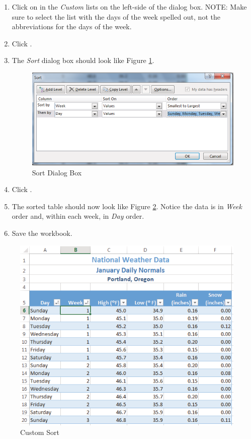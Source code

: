 \begin{enumbox}
\begin{enumerate}
		\item Click on  in the \textit{Custom} lists on the left-side of the dialog box. NOTE: Make sure to select the list with the days of the week spelled out, not the abbreviations for the days of the week.
		\item Click . 
		\item The \textit{Sort} dialog box should look like Figure \ref{05:fig14}.

		\begin{figure}[H]
			\centering
			\includegraphics[width=\maxwidth{.95\linewidth}]{gfx/ch05_fig14}
			\caption{Sort Dialog Box}
			\label{05:fig14}
		\end{figure}

		\item Click .
		\item The sorted table should now look like Figure \ref{05:fig15}. Notice the data is in \textit{Week} order and, within each week, in \textit{Day} order.
		\item Save the  workbook.
	\end{enumerate}
\end{enumbox}
	
\begin{figure}[H]
	\centering
	\includegraphics[width=\maxwidth{.95\linewidth}]{gfx/ch05_fig15}
	\caption{Custom Sort}
	\label{05:fig15}
\end{figure}

